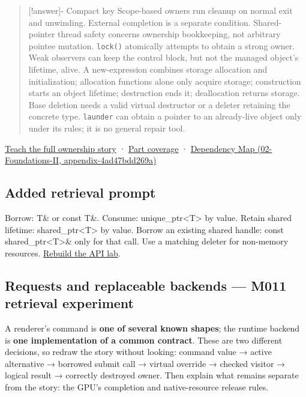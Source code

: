 \begin{quote}
{[}!answer{]}- Compact key Scope-based owners run cleanup on normal exit and unwinding. External completion is a separate condition. Shared-pointer thread safety concerns ownership bookkeeping, not arbitrary pointee mutation. \texttt{lock()} atomically attempts to obtain a strong owner. Weak observers can keep the control block, but not the managed object's lifetime, alive. A new-expression combines storage allocation and initialization; allocation functions alone only acquire storage; construction starts an object lifetime; destruction ends it; deallocation returns storage. Base deletion needs a valid virtual destructor or a deleter retaining the concrete type. \texttt{launder} can obtain a pointer to an already-live object only under its rules; it is no general repair tool.
\end{quote}

\hyperref[01-foundations-i-ch004-from-a-live-object-to-responsible-resource-ownership]{Teach the full ownership story} · \hyperref[appendix-fd090d982a15-m010---parts-148-160]{Part coverage} · \href{../02-Foundations-II/main.pdf\#nameddest=appendix-4ad47bdd269a}{Dependency Map (02-Foundations-II, appendix-4ad47bdd269a)}

\subsection{Added retrieval prompt}\label{appendix-960160274237-added-retrieval-prompt}

Borrow: T\& or const T\&. Consume: unique\_ptr\textless T\textgreater{} by value. Retain shared lifetime: shared\_ptr\textless T\textgreater{} by value. Borrow an existing shared handle: const shared\_ptr\textless T\textgreater{}\& only for that call. Use a matching deleter for non-memory resources. \hyperref[01-foundations-i-ch003-worked-api-choice-borrow-consume-retain-or-copy-a-value]{Rebuild the API lab}.

\subsection{Requests and replaceable backends --- M011 retrieval experiment}\label{appendix-960160274237-requests-and-replaceable-backends-m011-retrieval-experiment}

A renderer's command is \textbf{one of several known shapes}; the runtime backend is \textbf{one implementation of a common contract}. These are two different decisions, so redraw the story without looking: command value → active alternative → borrowed submit call → virtual override → checked visitor → logical result → correctly destroyed owner. Then explain what remains separate from the story: the GPU's completion and native-resource release rules.

